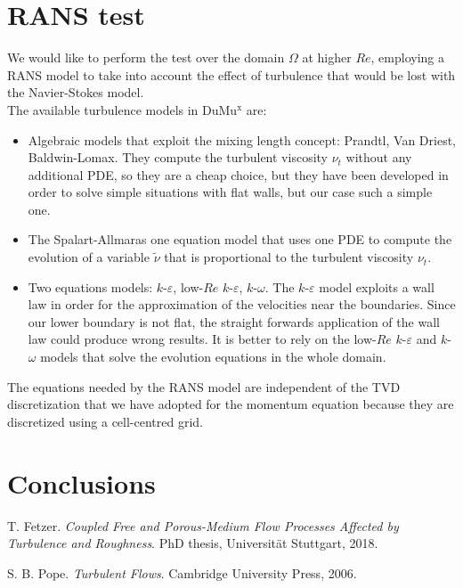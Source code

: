\documentclass[11pt, a4paper]{article}
\newcommand{\DUMUX}{DuMu$^\mathrm{x}$\xspace} %
\theoremstyle{definition}
\begin{document}
\section{RANS test}
We would like to perform the test over the domain $\Omega$ at higher $Re$, 
employing a RANS model to take into account the effect of turbulence that would 
be lost with the Navier-Stokes model.\\
The available turbulence models in \DUMUX are:
\begin{itemize}
	\item Algebraic models that exploit the mixing length concept: Prandtl, Van 
	Driest, Baldwin-Lomax. They compute the turbulent viscosity $\nu_t$ without 
	any additional PDE, so they are a cheap choice, but they have been 
	developed in order to solve simple situations with flat walls, but our case 
	such a simple one.
	\item The Spalart-Allmaras one equation model that uses one PDE to compute 
	the evolution of a variable $\tilde{\nu}$ that is proportional to the 
	turbulent viscosity $\nu_t$.
	\item Two equations models: $k$-$\varepsilon$, low-$Re$ $k$-$\varepsilon$, 
	$k$-$\omega$. The $k$-$\varepsilon$ model exploits a wall law in order for 
	the approximation of the velocities near the boundaries. Since our lower 
	boundary is not flat, the straight forwards application of the wall law 
	could produce wrong results. It is better to rely on the low-$Re$ 
	$k$-$\varepsilon$ and $k$-$\omega$ models that solve the evolution 
	equations in the whole domain.
\end{itemize}
%
The equations needed by the RANS model are independent of the TVD 
discretization that we have adopted for the momentum equation because they are 
discretized using a cell-centred grid.

\section{Conclusions}
\begin{thebibliography}{99}\label{sec:bib}
	
	 T. Fetzer. \emph{Coupled Free and Porous-Medium Flow 
	Processes Affected by Turbulence and Roughness}. PhD thesis, Universit\"at 
	Stuttgart, 2018.
	
	 S. B. Pope. \emph{Turbulent Flows}. Cambridge University 
	Press, 2006.
	
\end{thebibliography}
\end{document}
